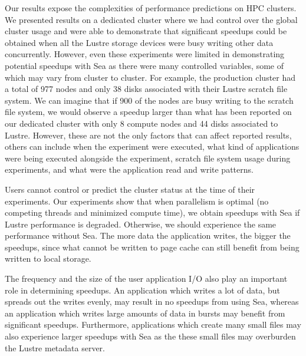 \documentclass[fleqn,10pt]{wlscirep}
\begin{document}
    Our results expose the complexities of performance predictions on HPC clusters. We presented results on a dedicated cluster
    where we had
    control over the global cluster usage and were able to demonstrate that
    significant speedups could be obtained when all the Lustre storage devices were
    busy writing other data concurrently. However, even these experiments were
    limited in demonstrating potential speedups with Sea as there were many
    controlled variables, some of which may vary from cluster to cluster. For
    example, the production cluster had a total of 977 nodes and only 38 disks associated with
    their Lustre scratch file system. We can imagine that if 900 of the nodes
    are busy writing to the scratch file system, we would observe a speedup
    larger than what has been reported on our dedicated cluster with only 8 compute
    nodes and 44 disks associated to Lustre. However, these are not the only
    factors that can affect reported results, others can include when the
    experiment were executed, what kind of applications were being executed
    alongside the experiment, scratch file system usage during experiments, and
    what were the application read and write patterns.

    Users cannot control or predict the cluster status at the time of their
    experiments.
    Our experiments show that when parallelism is optimal (no competing threads
    and minimized compute time), we obtain speedups with Sea if Lustre
    performance is degraded. Otherwise, we should experience the same
    performance without Sea. The more data the application writes, the bigger
    the speedups, since what cannot be written to page cache can still benefit from
    being written to local storage.
    
    The frequency and the size of the user application I/O also play an
    important role in determining speedups. An application which writes a lot of
    data, but spreads out the writes evenly, may result in no speedups from
    using Sea, whereas an application which writes large amounts of data in
    bursts may benefit from significant speedups. Furthermore, applications
    which create many small files may also experience larger speedups with Sea
    as the these small files may overburden the Lustre metadata server.

    
\end{document}

